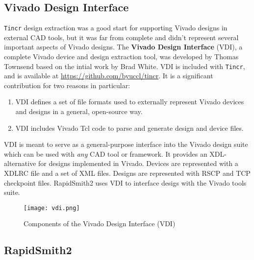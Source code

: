 \subsection{Vivado Design Interface}
\texttt{Tincr} design extraction was a good start for supporting Vivado designs
in external CAD tools, but it was far from complete and didn't represent several
important aspects of Vivado designs. The \textbf{Vivado Design Interface} (VDI),
a complete Vivado device and design extraction tool, was developed by Thomas
Townsend based on the intial work by Brad White. VDI is included with
\texttt{Tincr}, and is available at {\color{blue}
\url{https://github.com/byuccl/tincr}}. It is a  significant contribution for
two reasons in particular:

\begin{enumerate}
  \item VDI defines a set of file formats used to externally represent
  Vivado devices and designs in a general, open-source way.
  
  \item VDI includes Vivado Tcl code to parse and generate design and device
  files.
\end{enumerate}

\noindent VDI is meant to serve as a general-purpose interface into the Vivado
design suite which can be used with \textit{any} CAD tool or framework. It
provides an XDL-alternative for designs implemented in Vivado. Devices are
represented with a XDLRC file and a set of XML files. Designs are represented
with RSCP and TCP checkpoint files. RapidSmith2 uses VDI to interface desigs
with the Vivado tools suite.

\begin{figure}[h!]
 \centering
 \texttt{[image: vdi.png]}
 \caption{Components of the Vivado Design Interface (VDI)}
 \label{fig:vdi}
\end{figure}

\subsection{RapidSmith2}

